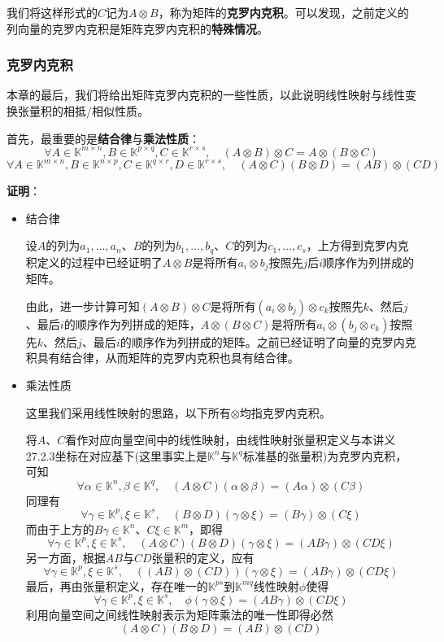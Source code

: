 \documentclass[a4paper,UTF8,fontset=windows,AutoFakeBold]{ctexart}
\newcommand{\proo}[1]{{\vspace{5pt}\kaishu\noindent\textbf{证明}：\vspace{-3pt}
\begin{compactitem}
    \item[] #1
\end{compactitem}
}}
\begin{document}
我们将这样形式的$C$记为$A\otimes B$，称为矩阵的\textbf{克罗内克积}。可以发现，之前定义的列向量的克罗内克积是矩阵克罗内克积的\textbf{特殊情况}。

\subsubsection{克罗内克积}
本章的最后，我们将给出矩阵克罗内克积的一些性质，以此说明线性映射与线性变换张量积的相抵/相似性质。

首先，最重要的是\textbf{结合律}与\textbf{乘法性质}：
$$\forall A\in\mathbb{K}^{m\times n},B\in\mathbb{K}^{p\times q},C\in\mathbb{K}^{r\times s},\quad (A\otimes B)\otimes C=A\otimes(B\otimes C)$$
$$\forall A\in\mathbb{K}^{m\times n},B\in\mathbb{K}^{n\times p},C\in\mathbb{K}^{q\times r},D\in\mathbb{K}^{r\times s},\quad (A\otimes C)(B\otimes D)=(AB)\otimes(CD)$$

\proo{
    \begin{itemize}
        \item 结合律
        
        设$A$的列为$a_1,\dots,a_n$、$B$的列为$b_1,\dots,b_q$、$C$的列为$c_1,\dots,c_s$，上方得到克罗内克积定义的过程中已经证明了$A\otimes B$是将所有$a_i\otimes b_j$按照先$j$后$i$顺序作为列拼成的矩阵。
        
        由此，进一步计算可知$(A\otimes B)\otimes C$是将所有$(a_i\otimes b_j)\otimes c_k$按照先$k$、然后$j$、最后$i$的顺序作为列拼成的矩阵，$A\otimes(B\otimes C)$是将所有$a_i\otimes (b_j\otimes c_k)$按照先$k$、然后$j$、最后$i$的顺序作为列拼成的矩阵。之前已经证明了向量的克罗内克积具有结合律，从而矩阵的克罗内克积也具有结合律。

        \item 乘法性质

        这里我们采用线性映射的思路，以下所有$\otimes$均指克罗内克积。
        
        将$A$、$C$看作对应向量空间中的线性映射，由线性映射张量积定义与本讲义27.2.3坐标在对应基下(这里事实上是$\mathbb{K}^n$与$\mathbb{K}^q$标准基的张量积)为克罗内克积，可知
        $$\forall\alpha\in\mathbb{K}^n,\beta\in\mathbb{K}^q,\quad (A\otimes C)(\alpha\otimes\beta)=(A\alpha)\otimes(C\beta)$$
        同理有
        $$\forall\gamma\in\mathbb{K}^p,\xi\in\mathbb{K}^s,\quad (B\otimes D)(\gamma\otimes\xi)=(B\gamma)\otimes(C\xi)$$
        而由于上方的$B\gamma\in\mathbb{K}^n$、$C\xi\in\mathbb{K}^m$，即得
        $$\forall\gamma\in\mathbb{K}^p,\xi\in\mathbb{K}^s,\quad (A\otimes C)(B\otimes D)(\gamma\otimes\xi)=(AB\gamma)\otimes(CD\xi)$$
        另一方面，根据$AB$与$CD$张量积的定义，应有
        $$\forall\gamma\in\mathbb{K}^p,\xi\in\mathbb{K}^s,\quad ((AB)\otimes(CD))(\gamma\otimes\xi)=(AB\gamma)\otimes(CD\xi)$$
        最后，再由张量积定义，存在唯一的$\mathbb{K}^{ps}$到$\mathbb{K}^{mq}$线性映射$\phi$使得
        $$\forall\gamma\in\mathbb{K}^p,\xi\in\mathbb{K}^s,\quad \phi(\gamma\otimes\xi)=(AB\gamma)\otimes(CD\xi)$$
        利用向量空间之间线性映射表示为矩阵乘法的唯一性即得必然
        $$(A\otimes C)(B\otimes D)=(AB)\otimes(CD)$$
    \end{itemize}
}
\end{document}
